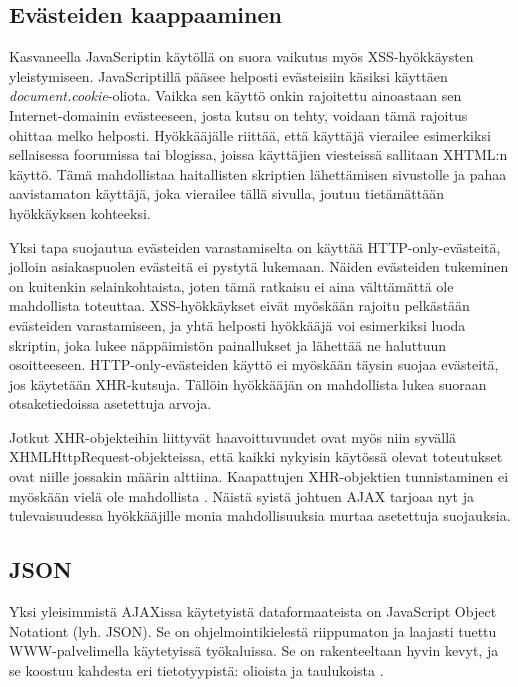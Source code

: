 \subsection{Evästeiden kaappaaminen}

Kasvaneella JavaScriptin käytöllä on suora vaikutus myös
XSS-hyök\-käys\-ten yleistymiseen. JavaScriptillä pääsee helposti
evästeisiin käsiksi käyttäen \emph{document.cookie}-oliota. Vaikka sen
käyttö onkin rajoitettu ainoastaan sen Internet-domainin evästeeseen,
josta kutsu on tehty, voidaan tämä rajoitus ohittaa melko
helposti. Hyökkääjälle riittää, että käyttäjä vierailee esimerkiksi
sellaisessa foorumissa tai blogissa, joissa käyttäjien viesteissä
sallitaan XHTML:n käyttö. Tämä mahdollistaa haitallisten skriptien
lähettämisen sivustolle ja pahaa aavistamaton käyttäjä, joka vierailee
tällä sivulla, joutuu tietämättään hyökkäyksen kohteeksi.

Yksi tapa suojautua evästeiden varastamiselta on käyttää
HTTP-only-evästeitä, jolloin asiakaspuolen evästeitä ei pystytä
lukemaan. Näiden evästeiden tukeminen on kuitenkin selainkohtaista,
joten tämä ratkaisu ei aina välttämättä ole mahdollista
toteuttaa. XSS-hyök\-käyk\-set eivät myöskään rajoitu pelkästään
evästeiden varastamiseen, ja yhtä helposti hyökkääjä voi esimerkiksi
luoda skriptin, joka lukee näppäimistön painallukset ja lähettää ne
haluttuun osoitteeseen. HTTP-only-evästeiden käyttö ei myöskään täysin
suojaa evästeitä, jos käytetään XHR-kutsuja. Tällöin hyökkääjän on
mahdollista lukea suoraan otsaketiedoissa asetettuja arvoja.

Jotkut XHR-objekteihin liittyvät haavoittuvuudet ovat myös niin
syvällä XHMLHttpRequest-objekteissa, että kaikki nykyisin käytössä
olevat toteutukset ovat niille jossakin määrin alttiina. Kaapattujen
XHR-objektien tunnistaminen ei myöskään vielä ole mahdollista
\cite{AJAX}. Näistä syistä johtuen AJAX tarjoaa nyt ja tulevaisuudessa
hyökkääjille monia mahdollisuuksia murtaa asetettuja suojauksia.

\subsection{JSON}

Yksi yleisimmistä AJAXissa käytetyistä dataformaateista on JavaScript
Object Notationt (lyh. JSON). Se on ohjelmointikielestä riippumaton ja
laajasti tuettu WWW-palvelimella käytetyissä työkaluissa. Se on
rakenteeltaan hyvin kevyt, ja se koostuu kahdesta eri tietotyypistä:
olioista ja taulukoista \cite{JSON}.

